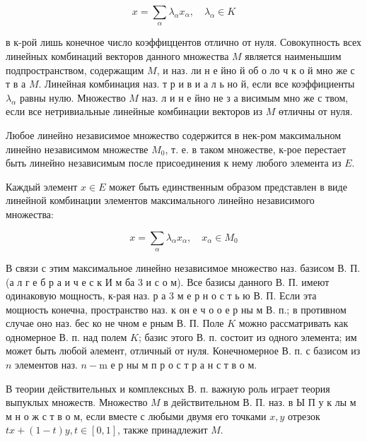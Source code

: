 \documentclass[10pt]{article}
\begin{document}
\[

x=\sum_{\alpha} \lambda_{\alpha} x_{\alpha}, \quad \lambda_{\alpha} \in K

\]



в к-рой лишь конечное число коэффиццентов отлично от нуля. Совокупность всех линейных комбинаций векторов данного множества $M$ является наименышим подпространством, содержащим $M$, и наз. ли н е йно й об о ло ч к о й мно же с т в а $M$. Линейная комбинация наз. т р и в и а л ь но й, если все коэффициенты $\lambda_{\alpha}$ равны нулю. Множество $M$ наз. л и н е йно не з а висимым мно же с твом, если все нетривиальные линейные комбинации векторов из $M$ өтличны от нуля.



Любое линейно независимое множество содержится в нек-ром максимальном линейно независимом множестве $M_{0}$, т. е. в таком множестве, к-рое перестает быть линейно независимым после присоединения к нему любого элемента из $E$.



Каждый элемент $x \in E$ может быть единственным образом представлен в виде линейной комбинации элементов максимального линейно независимого множества:



\[

x=\sum_{\alpha} \lambda_{\alpha} x_{\alpha}, \quad x_{\alpha} \in M_{0}

\]



В связи с этим максимальное линейно независимое множество наз. базисом В. П. (а л г е б р а и ч е с к И м ба 3 и с о м). Все базисы данного В. П. имеют одинаковую мощность, к-рая наз. р а 3 м е р н о с т ь ю В. П. Если эта мощность конечна, пространство наз. к он е ч о о е р ны м В. п.; в противном случае оно наз. бес ко не чном е рным В. П. Поле $K$ можно рассматривать как одномерное В. п. над полем $K$; базис этого В. п. состоит из одного элемента; им может быть любой әлемент, отличный от нуля. Конечномерное В. п. с базисом из $n$ элементов наз. $n-\mathrm{m}$ е р ны м п р о с т р а н с т в о м.



В теории действительных и комплексных В. п. важную роль играет теория выпуклых множеств. Множество $M$ в действительном В. П. наз. в Ы П у к лы м м н о ж с т в о м, если вместе с любыми двумя его точками $x, y$ отрезок $t x+(1-t) y, t \in[0,1]$, также принадлежит $M$.
\end{document}
